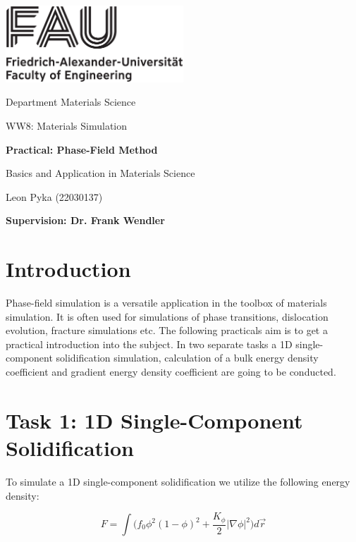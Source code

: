 




%
\begin{titlepage}
\begin{center}
\includegraphics[width=0.5\textwidth]{graphics/FAU_TechFak_EN_H_black.eps}

\LARGE Department Materials Science

\Large WW8: Materials Simulation

\LARGE \textbf{Practical: Phase-Field Method}

\Large Basics and Application in Materials Science



\vfil
\Large Leon Pyka (22030137)



\Large \textbf{Supervision: Dr. Frank Wendler }
\end{center}

\thispagestyle{empty}
%
\end{titlepage}
%

\setcounter{page}{1}

\tableofcontents
\newpage
\section{Introduction}
Phase-field simulation is a versatile application in the toolbox of materials simulation. It is often used for simulations of phase transitions, dislocation evolution, fracture simulations etc. The following practicals aim is to get a practical introduction into the subject. In two separate tasks a 1D single-component solidification simulation, calculation of a bulk energy density coefficient and gradient energy density coefficient are going to be conducted. 

\section{Task 1: 1D Single-Component Solidification} \label{sec:task1}

To simulate a 1D single-component solidification we utilize the following energy density:

\begin{equation}
	F = \int \bigl( f_{0} \phi^{2}(1- \phi)^{2}  + \frac{K_{\phi}}{2} \lvert \nabla \phi \rvert ^{2} \bigr) d \vec{r}
\end{equation}

